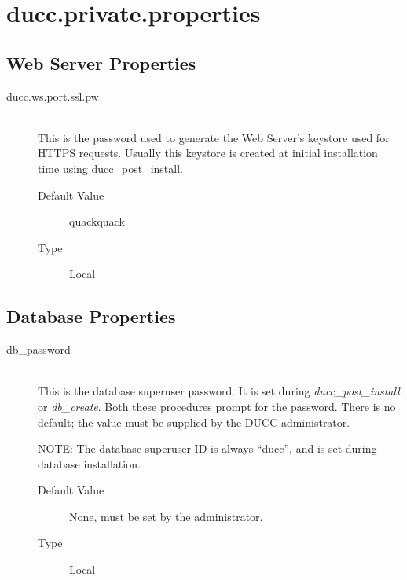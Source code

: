 \section{ducc.private.properties}
\label{sec:ducc.private.properties}

\subsection{Web Server Properties}

    \begin{description}
    
        \item[ducc.ws.port.ssl.pw] \hfill \\
          This is the password used to generate the Web Server's keystore used for HTTPS requests.  Usually
          this keystore is created at initial installation time using \hyperref[subsec:install.single-user]{ducc\_post\_install.}
          \begin{description}
            \item[Default Value] quackquack 
            \item[Type] Local
          \end{description}
    \end{description}    
        

\subsection{Database Properties}

    \begin{description}
    
        \item[db\_password] \hfill \\
          This is the database superuser password.  It is set during {\em ducc\_post\_install} or {\em db\_create}.  Both
          these procedures prompt for the password.  There is no default; the value must be supplied by the DUCC administrator.

          NOTE: The database superuser ID is always ``ducc'', and is set during database installation.
          \begin{description}
            \item[Default Value] None, must be set by the administrator.
            \item[Type] Local
          \end{description}
    \end{description}    
        
